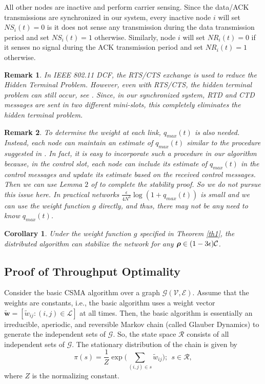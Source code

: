 \documentclass[10pt,onecolumn,draftclsnofoot,journal]{IEEEtran}
\newtheorem{corollary}{Corollary}
\newtheorem{remark}{Remark}
\newcommand{\brho}{\mbox{\boldmath$\rho$}}
\newcommand{\cG}{\mathcal{G}}
\newcommand{\cV}{\mathcal{V}}
\newcommand{\cE}{\mathcal{E}}
\begin{document}
All other nodes are inactive and perform carrier sensing. Since the data/ACK transmissions are synchronized in our system, every inactive node $i$ will set $NS_i(t)=0$ is it does not sense any transmission during the data transmission period and set $NS_i(t)=1$ otherwise. Similarly, node $i$ will set $NR_i(t) = 0$ if it senses
no signal during the ACK transmission period and set $NR_i(t) = 1$ otherwise.
\begin{remark}
In IEEE 802.11 DCF, the RTS/CTS exchange is used
to reduce the Hidden Terminal Problem. However, even with
RTS/CTS, the hidden terminal problem can still occur, see \cite{srikant2}. Since, in our synchronized system, RTD and CTD messages are sent in two different mini-slots, this completely eliminates the hidden terminal problem.
\end{remark}
\begin{remark}
To determine the weight at each link, $q_{max}(t)$ is also needed. Instead, each node can maintain an estimate of $q_{max}(t)$ similar to the procedure suggested in \cite{shah}. In fact, it is easy to incorporate such a procedure in our algorithm because, in the control slot, each node can include its estimate of $q_{max}(t)$ in the control messages and update its estimate based on the received control messages. Then we can use Lemma $2$ of \cite{shah} to complete the stability proof. So we do not pursue this issue here. In practical networks $\frac{\epsilon}{4 N^3} \log (1+q_{max}(t)) $ is small and we can use the weight function $g$ directly, and thus, there may not be any need to know $q_{max}(t)$.
\end{remark}
\begin{corollary}\label{dis}
Under the weight function $g$ specified in Theorem \ref{th1}, the distributed algorithm can stabilize the network for any $\brho \in (1-3\epsilon)\mathcal{C} $.
\end{corollary}
\subsection{Proof of Throughput Optimality}\label{sec:csma_proofs}
Consider the basic CSMA algorithm over a graph $\cG(\cV,\cE)$. Assume that the weights are constants, i.e., the basic algorithm uses a weight vector $\mathbf{\tilde{w}}=[\tilde{w}_{ij}:(i,j) \in \mathcal{L}]$ at all times. Then, the basic algorithm is essentially an irreducible, aperiodic, and reversible Markov chain (called Glauber Dynamics) to generate the independent sets of $\cG$. So, the state space $\mathcal{R}$ consists of all independent sets of $\cG$. The stationary distribution of the chain is given by
\begin{equation}\label{stationary}
\pi(s)=\frac{1}{Z} \exp\Big(\sum_{(i,j) \in s} \tilde{w}_{ij}\Big);\ \ s \in \mathcal{R},
\end{equation}
where $Z$ is the normalizing constant.
\end{document}
